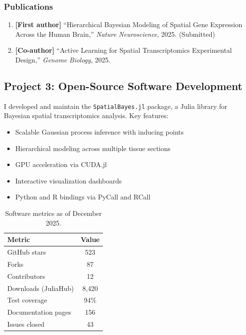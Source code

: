 \documentclass[
    language=english,
    doctype=postdoc-report,
    institution=none,
]{../../omnilatex}
\begin{document}
\subsubsection{Publications}

\begin{enumerate}
    \item \textbf{[First author]} ``Hierarchical Bayesian Modeling of
          Spatial Gene Expression Across the Human Brain,'' \textit{Nature
          Neuroscience}, 2025. (Submitted)
    \item \textbf{[Co-author]} ``Active Learning for Spatial Transcriptomics
          Experimental Design,'' \textit{Genome Biology}, 2025.
\end{enumerate}

\subsection{Project 3: Open-Source Software Development}

I developed and maintain the \texttt{SpatialBayes.jl} package, a Julia
library for Bayesian spatial transcriptomics analysis. Key features:

\begin{itemize}
    \item Scalable Gaussian process inference with inducing points
    \item Hierarchical modeling across multiple tissue sections
    \item GPU acceleration via CUDA.jl
    \item Interactive visualization dashboards
    \item Python and R bindings via PyCall and RCall
\end{itemize}

\begin{table}[htbp]
    \centering
    \caption{Software metrics as of December 2025.}
    \label{tab:software}
    \begin{tabular}{@{}lc@{}}
        \toprule
        Metric & Value \\
        \midrule
        GitHub stars & 523 \\
        Forks & 87 \\
        Contributors & 12 \\
        Downloads (JuliaHub) & 8,420 \\
        Test coverage & 94\% \\
        Documentation pages & 156 \\
        Issues closed & 43 \\
        \bottomrule
    \end{tabular}
\end{table}
\end{document}

